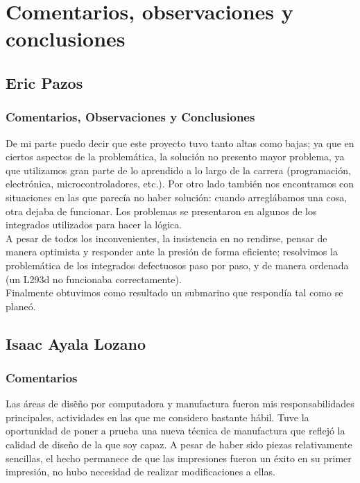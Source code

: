 \pagebreak[2]

\section{Comentarios, observaciones y conclusiones}
\subsection{Eric Pazos}
\subsubsection{Comentarios, Observaciones y Conclusiones}
De mi parte puedo decir que este proyecto tuvo tanto altas como bajas; ya que en ciertos aspectos de la problem\'atica,
la solución no presento mayor problema, ya que utilizamos gran parte de lo aprendido a lo largo de la carrera
(programaci\'on, electr\'onica, microcontroladores, etc.). Por otro lado tambi\'en nos encontramos con situaciones en
las que parec\'ia no haber soluci\'on: cuando arregl\'abamos una cosa, otra dejaba de funcionar. Los problemas se
presentaron en algunos de los integrados utilizados para hacer la l\'ogica.\\

A pesar de todos los inconvenientes, la insistencia en no rendirse, pensar de manera optimista y responder ante la
presi\'on de forma eficiente; resolvimos la problem\'atica de los integrados defectuosos paso por paso, y de manera
ordenada (un L293d no funcionaba correctamente).\\

Finalmente obtuvimos como resultado un submarino que respond\'ia tal como se plane\'o.

\subsection{Isaac Ayala Lozano}
\subsubsection{Comentarios}
Las \'areas de dis\~e\~no por computadora y manufactura fueron mis responsabilidades principales, actividades en las que
me considero bastante h\'abil. Tuve la oportunidad de poner a prueba una nueva t\'ecnica de manufactura que reflej\'o
la calidad de dise\~no de la que soy capaz. A pesar de haber sido piezas relativamente sencillas, el hecho permanece de que
las impresiones fueron un \'exito en su primer impresi\'on, no hubo necesidad de realizar modificaciones a ellas.

